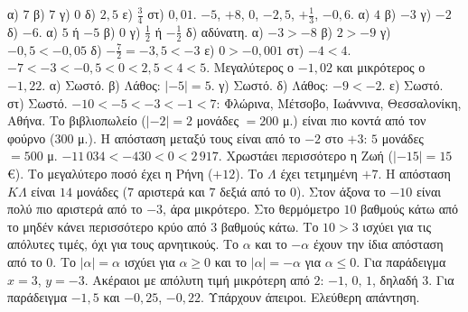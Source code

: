  α) $7$ \quad β) $7$ \quad γ) $0$ \quad δ) $2{,}5$ \quad ε) $\frac{3}{4}$ \quad στ) $0{,}01$.
 $-5$, $+8$, $0$, $-2{,}5$, $+\frac{1}{3}$, $-0{,}6$.
 α) $4$ \quad β) $-3$ \quad γ) $-2$ \quad δ) $-6$.
 α) $5$ ή $-5$ \quad β) $0$ \quad γ) $\frac{1}{2}$ ή $-\frac{1}{2}$ \quad δ) αδύνατη.
 α) $-3>-8$ \quad β) $2>-9$ \quad γ) $-0{,}5<-0{,}05$ \quad δ) $-\frac{7}{2}=-3{,}5<-3$ \quad ε) $0>-0{,}001$ \quad στ) $-4<4$.
 $-7<-3<-0{,}5<0<2{,}5<4<5$.
 Μεγαλύτερος ο $-1{,}02$ και μικρότερος ο $-1{,}22$.
 α) Σωστό. β) Λάθος: $|-5|=5$. γ) Σωστό. δ) Λάθος: $-9<-2$. ε) Σωστό. στ) Σωστό.
 $-10<-5<-3<-1<7$: Φλώρινα, Μέτσοβο, Ιωάννινα, Θεσσαλονίκη, Αθήνα.
 Το βιβλιοπωλείο ($|{-2}|=2$ μονάδες $=200$ μ.) είναι πιο κοντά από τον φούρνο ($300$ μ.). Η απόσταση μεταξύ τους είναι από το $-2$ στο $+3$: $5$ μονάδες $=500$ μ.
 $-11\,034<-430<0<2\,917$.
 Χρωστάει περισσότερο η Ζωή ($|{-15}|=15$ €). Το μεγαλύτερο ποσό έχει η Ρήνη ($+12$).
 Το $\Lambda$ έχει τετμημένη $+7$. Η απόσταση $K\Lambda$ είναι $14$ μονάδες ($7$ αριστερά και $7$ δεξιά από το $0$).
 Στον άξονα το $-10$ είναι πολύ πιο αριστερά από το $-3$, άρα μικρότερο. Στο θερμόμετρο $10$ βαθμούς κάτω από το μηδέν κάνει περισσότερο κρύο από $3$ βαθμούς κάτω. Το $10>3$ ισχύει για τις απόλυτες τιμές, όχι για τους αρνητικούς.
 Το $\alpha$ και το $-\alpha$ έχουν την ίδια απόσταση από το $0$.
 Το $|\alpha|=\alpha$ ισχύει για $\alpha\ge0$ και το $|\alpha|=-\alpha$ για $\alpha\le0$.
 Για παράδειγμα $x=3$, $y=-3$. Ακέραιοι με απόλυτη τιμή μικρότερη από $2$: $-1,\,0,\,1$, δηλαδή $3$.
 Για παράδειγμα $-1{,}5$ και $-0{,}25$, $-0{,}22$. Υπάρχουν άπειροι.
 Ελεύθερη απάντηση.
